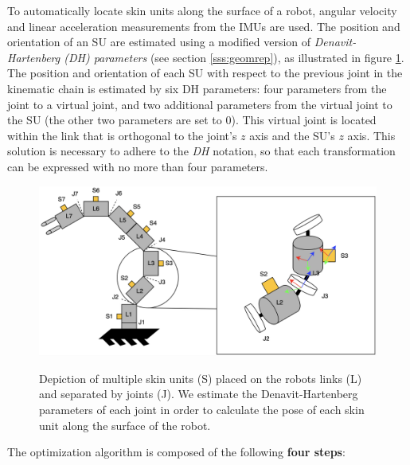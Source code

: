 To automatically locate skin units along the surface of a robot, angular velocity and linear acceleration measurements from the IMUs are used. The position and orientation of an SU are estimated
using a modified version of \textit{Denavit-Hartenberg (DH) parameters} (see section \ref{sss:geomrep}), as illustrated in figure \ref{fig:calibration_theory}.
The position and orientation of each SU with respect to the previous
joint in the kinematic chain is estimated by six DH parameters: four parameters from the joint to a virtual joint,
and two additional parameters from the virtual joint to the SU (the other two parameters are set to $0$). This virtual joint is located within the link that is orthogonal to the joint’s $z$ axis and the SU’s $z$ axis.
This solution is necessary to adhere to the \textit{DH} notation,
so that each transformation can be expressed with no more than four parameters.

\begin{figure}[H]
    \caption[Calibration theory]{
        Depiction of multiple skin units (S) placed on the robots links (L) and separated by joints (J).
        We estimate the Denavit-Hartenberg parameters of each joint in order to calculate the pose of each skin unit along the surface of the robot.
    }
    \centering
    \includegraphics[width=\textwidth]{figs/calibration_theory.png}
\label{fig:calibration_theory}
\end{figure}

The optimization algorithm is composed of the following \textbf{four steps}:

